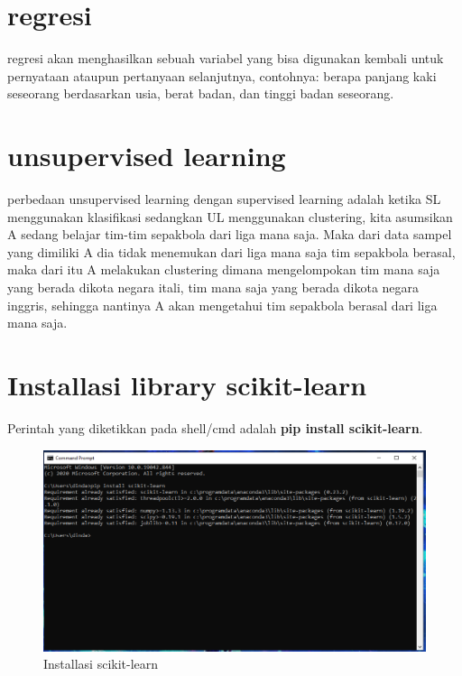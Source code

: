 \section{regresi}
\par regresi akan menghasilkan sebuah variabel yang bisa digunakan kembali untuk pernyataan ataupun pertanyaan selanjutnya, contohnya: berapa panjang kaki seseorang berdasarkan usia, berat badan, dan tinggi badan seseorang.

\section{unsupervised learning}
\par perbedaan unsupervised learning dengan supervised learning adalah ketika SL menggunakan klasifikasi sedangkan UL menggunakan clustering, kita asumsikan A sedang belajar tim-tim sepakbola dari liga mana saja. Maka dari data sampel yang dimiliki A dia tidak menemukan dari liga mana saja tim sepakbola berasal, maka dari itu A melakukan clustering dimana mengelompokan tim mana saja yang berada dikota negara itali, tim mana saja yang berada dikota negara inggris, sehingga nantinya A akan mengetahui tim sepakbola berasal dari liga mana saja.

\section{Installasi library scikit-learn}
\par Perintah yang diketikkan pada shell/cmd adalah \textbf{pip install scikit-learn}.
\begin{figure} [H]
    \centering
    \includegraphics[scale=0.6]{figures/install_scikit_learn.PNG}
    \caption{Installasi scikit-learn}
    \label{fig:install_scikit_learn}
\end{figure}

